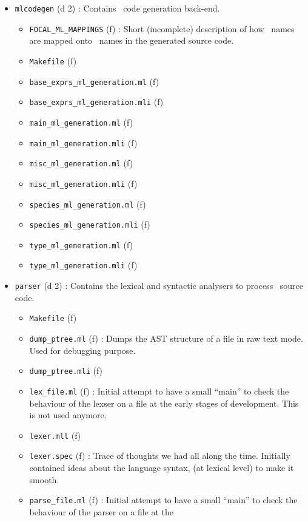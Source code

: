 \begin{itemize}
\begin{itemize}
\begin{itemize}
    \end{itemize}
  \item {\tt mlcodegen} (d 2) : Contains \ocaml\ code generation back-end.
    \begin{itemize}
    \item {\tt FOCAL\_ML\_MAPPINGS} (f) : Short (incomplete) description
      of how \focalize\ names are mapped onto \ocaml\ names in the
      generated source code.
    \item {\tt Makefile} (f)
    \item {\tt base\_exprs\_ml\_generation.ml} (f)
    \item {\tt base\_exprs\_ml\_generation.mli} (f)
    \item {\tt main\_ml\_generation.ml} (f)
    \item {\tt main\_ml\_generation.mli} (f)
    \item {\tt misc\_ml\_generation.ml} (f)
    \item {\tt misc\_ml\_generation.mli} (f)
    \item {\tt species\_ml\_generation.ml} (f)
    \item {\tt species\_ml\_generation.mli} (f)
    \item {\tt type\_ml\_generation.ml} (f)
    \item {\tt type\_ml\_generation.mli} (f)
    \end{itemize}
  \item {\tt parser} (d 2) : Contains the lexical and syntactic
    analysers to process \focalize\ source code.
    \begin{itemize}
    \item {\tt Makefile} (f)
    \item {\tt dump\_ptree.ml} (f) : Dumps the AST structure of a file
      in raw text mode. Used for debugging purpose.
    \item {\tt dump\_ptree.mli} (f)
    \item {\tt lex\_file.ml} (f) : Initial attempt to have a small
      ``main'' to check the behaviour of the lexser on a file at the
      early stages of development. This is not used anymore.
    \item {\tt lexer.mll} (f)
    \item {\tt lexer.spec} (f) : Trace of thoughts we had all along
      the time. Initially contained ideas about the language syntax,
      (at lexical level) to make it smooth.
    \item {\tt parse\_file.ml} (f) : Initial attempt to have a small
      ``main'' to check the behaviour of the parser on a file at the

\end{itemize}
\end{itemize}
\end{itemize}
